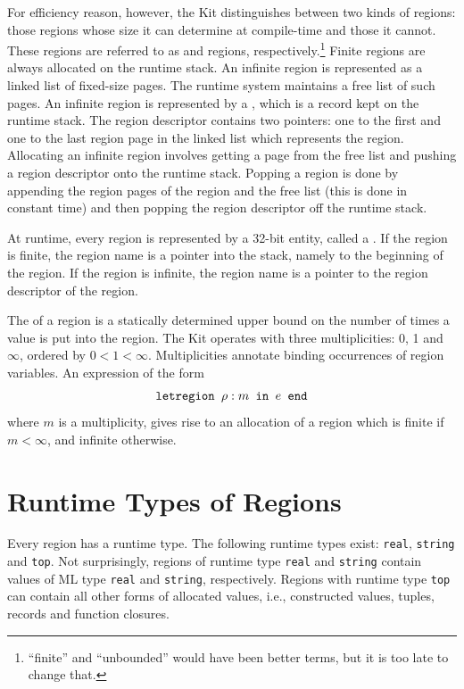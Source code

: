 \documentclass[12pt]{book}
\begin{document}
For efficiency reason, however, the Kit distinguishes 
between two kinds of regions: those regions whose
size it can determine at compile-time and those it cannot. 
These regions are referred to as  and 
 regions, 
respectively.\footnote{``finite'' and ``unbounded'' would have been better
terms, but it is too late to change that.}
Finite regions are always 
allocated on the runtime stack.
An infinite region is represented as a linked list of fixed-size pages.
The runtime system maintains a free list of such pages. An infinite region
is represented by a , which is a record kept on
the runtime stack. The region descriptor contains two pointers: one to
the first and one to the last region page in the linked list which 
represents the region. Allocating an infinite region involves getting a
page from the free list and pushing a region descriptor 
onto the runtime
stack. Popping a region is done by appending the region pages of the
region and the free list (this is done in constant time) and then popping
the region descriptor off the runtime stack.

At runtime, every region is represented by a 32-bit entity, called
a . If the region is finite, the
region name is a pointer into the stack, namely to the beginning of the
region. If the region is infinite, the region name is a pointer to
the region descriptor of the region. 

The  of a region is a statically determined upper
bound on the number of times a value is put into the region. The Kit
operates with three multiplicities: 0, 1 and $\infty$, ordered
by $0<1<\infty$. Multiplicities annotate
binding occurrences of region variables. An expression of the form
$$\hbox{\tt letregion $\rho:m$ in $e$ end}$$
where $m$ is a multiplicity,
gives rise to an allocation of a region which is finite if $m<\infty$, and
infinite otherwise.
\section{Runtime Types of Regions}
\label{runtimetypes.sec}
Every region has a runtime type. The following runtime types
exist: {\tt real}, {\tt string} and {\tt top}. Not surprisingly, regions of runtime type
{\tt real} and {\tt string} contain values of ML type {\tt real} and
{\tt string}, respectively. Regions with runtime type {\tt top} can contain
all other forms of allocated values, i.e., constructed values, tuples, records
and function closures.
\end{document}
